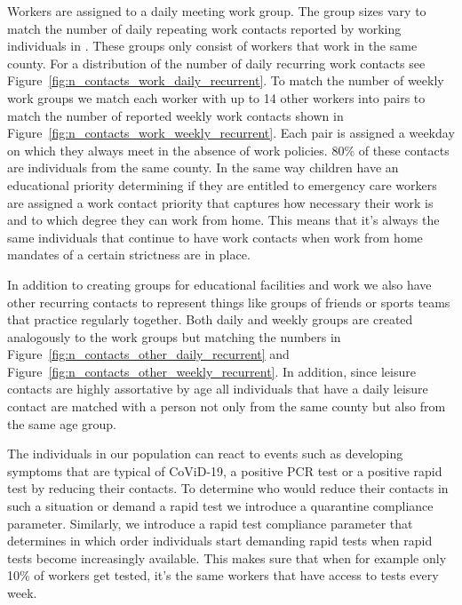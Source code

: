 Workers are assigned to a daily meeting work group. The group sizes vary to match the
number of daily repeating work contacts reported by working individuals in
\cite{Mossong2008}. These groups only consist of workers that work in the same county.
For a distribution of the number of daily recurring work contacts see
Figure~\ref{fig:n_contacts_work_daily_recurrent}. To match the number of weekly work groups
we match each worker with up to 14 other workers into pairs to match the number of
reported weekly work contacts shown in Figure~\ref{fig:n_contacts_work_weekly_recurrent}.
Each pair is assigned a weekday on which they always meet in the absence of work
policies. 80\% of these contacts are individuals from the same county.
In the same way children have an educational priority determining if they are entitled to
emergency care workers are assigned a work contact priority that captures how necessary
their work is and to which degree they can work from home. This means that it's always
the same individuals that continue to have work contacts when work from home mandates of
a certain strictness are in place.

In addition to creating groups for educational facilities and work we also have other
recurring contacts to represent things like groups of friends or sports teams that
practice regularly together. Both daily and weekly groups are created analogously to the
work groups but matching the numbers in Figure~\ref{fig:n_contacts_other_daily_recurrent}
and Figure~\ref{fig:n_contacts_other_weekly_recurrent}. In addition, since leisure
contacts are highly assortative by age all individuals that have a daily leisure contact
are matched with a person not only from the same county but also from the same age group.

The individuals in our population can react to events such as developing symptoms that
are typical of CoViD-19, a positive PCR test or a positive rapid test by reducing their
contacts. To determine who would reduce their contacts in such a situation or demand a
rapid test we introduce a quarantine compliance parameter. Similarly, we introduce a
rapid test compliance parameter that determines in which order individuals start
demanding rapid tests when rapid tests become increasingly available. This makes sure
that when for example only 10\% of workers get tested, it's the same workers that have
access to tests every week.

